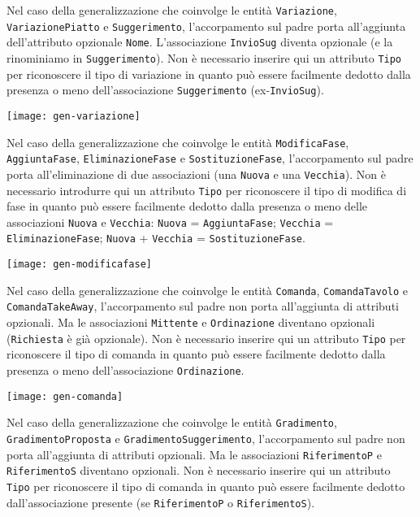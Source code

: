 Nel caso della generalizzazione che coinvolge le entità {\tt Variazione}, {\tt VariazionePiatto}
e {\tt Suggerimento}, l'accorpamento sul padre porta all'aggiunta dell'attributo opzionale
{\tt Nome}. L'associazione {\tt InvioSug} diventa opzionale (e la rinominiamo in {\tt Suggerimento}).
Non è necessario inserire qui un attributo {\tt Tipo} per riconoscere il tipo di variazione
in quanto può essere facilmente dedotto dalla presenza o meno dell'associazione {\tt Suggerimento} (\hbox{ex-\texttt{InvioSug}}).

\vspace{5pt}\centerline{\texttt{[image: gen-variazione]}}

\vspace{15pt}

Nel caso della generalizzazione che coinvolge le entità {\tt ModificaFase}, {\tt AggiuntaFase},
{\tt EliminazioneFase} e {\tt SostituzioneFase}, l'accorpamento sul padre porta all'eliminazione
di due associazioni (una {\tt Nuova} e una {\tt Vecchia}). Non è necessario introdurre qui un
attributo {\tt Tipo} per riconoscere il tipo di modifica di fase in quanto può essere facilmente
dedotto dalla presenza o meno delle associazioni {\tt Nuova} e {\tt Vecchia}: {\tt Nuova} = {\tt AggiuntaFase};
{\tt Vecchia} = {\tt EliminazioneFase}; {\tt Nuova} + {\tt Vecchia} = {\tt SostituzioneFase}.

\vspace{5pt}\centerline{\texttt{[image: gen-modificafase]}}

\vspace{15pt}

Nel caso della generalizzazione che coinvolge le entità {\tt Comanda}, {\tt ComandaTavolo}
e {\tt ComandaTakeAway}, l'accorpamento sul padre non porta all'aggiunta di attributi opzionali.
Ma le associazioni {\tt Mittente} e {\tt Ordinazione} diventano opzionali ({\tt Richiesta} è
già opzionale). Non è necessario inserire qui un attributo {\tt Tipo} per riconoscere
il tipo di comanda in quanto può essere facilmente dedotto dalla presenza o meno
dell'associazione {\tt Ordinazione}.

\vspace{5pt}\centerline{\texttt{[image: gen-comanda]}}

\vspace{15pt}

Nel caso della generalizzazione che coinvolge le entità {\tt Gradimento}, {\tt GradimentoProposta}
e {\tt GradimentoSuggerimento}, l'accorpamento sul padre non porta all'aggiunta di attributi opzionali.
Ma le associazioni {\tt RiferimentoP} e {\tt RiferimentoS} diventano opzionali.
Non è necessario inserire qui un attributo {\tt Tipo} per riconoscere il tipo di
comanda in quanto può essere facilmente dedotto dall'associazione presente (se
{\tt RiferimentoP} o {\tt RiferimentoS}).

